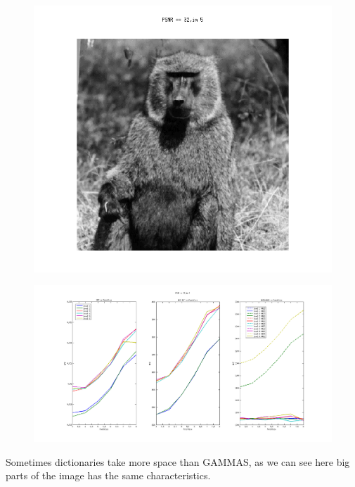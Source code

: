 \documentclass{article}
\begin{document}
\newpage 
\begin{figure}[h]
\centering
    \begin{center}
       \includegraphics[scale=0.3]{5.png}
    \end{center}
    \noindent
\end{figure}
\begin{figure}[h]
\centering
  
    \begin{center}
       \includegraphics[width=180mm]{fig5L.png}
     
    \end{center}
\end{figure}
Sometimes dictionaries take more space than GAMMAS, as we can see here  big parts of the image has the same characteristics.
\end{document}
